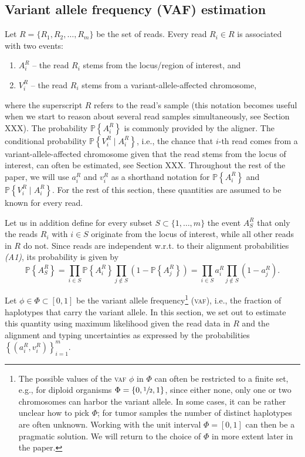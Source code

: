 \documentclass[a4paper,12pt]{article}
\newcommand{\p}[1]{\mathds{P}\left\{#1 \right\}}
\begin{document}
\subsection{Variant allele frequency (\textsc{VAF}) estimation}
Let $R = \{R_1, R_2, \dots, R_m \}$ be the set of reads. Every read $R_i \in R$ is associated with two events:
\begin{enumerate}
 \item $A_i^R$ -- the read $R_i$ stems from the locus/region of interest, and 
 \item $V_i^R$ -- the read $R_i$ stems from a variant-allele-affected chromosome, 
\end{enumerate}
where the superscript $R$ refers to the read's sample (this notation becomes useful when we start to reason about several read samples simultaneously, see Section XXX).  
The probability $\p{A_i^R}$ is commonly provided by the aligner. The conditional probability $\p{V_i^R \mid A_i^R}$, i.e., the chance that $i$-th read comes from a variant-allele-affected chromosome given that the read stems from the locus of interest, can often be estimated, see Section XXX. Throughout the rest of the paper, we will use $a_i^R$ and $v_i^R$ as a shorthand notation for $\p{A_i^R}$ and $\p{V_i^R \mid A_i^R}$. For the rest of this section, these quantities are assumed to be known for every read.   

Let us in addition define for every subset $S \subset \{1,\dots,m\}$ the event $A_S^R$ that only the reads $R_i$ with $i \in S$ originate from the locus of interest, while all other reads in $R$ do not. Since reads are independent w.r.t. to their alignment probabilities \textit{(A1)}, its probability is given by
\begin{equation}
 \p{A_S^R} =  \prod_{i \in S} \p{A_i^R} \prod_{j \not \in S} \left(1 - \p{A_j^R} \right) = \prod_{i \in S} a_i^R \prod_{j \not \in S} \left(1 - a_j^R \right). 
 \label{eq:subset}
\end{equation}

Let $\phi \in \Phi \subset [0,1]$ be the variant allele frequency\footnote{The possible values of the \textsc{vaf} $\phi$ in $\Phi$ can often be restricted to a finite set, e.g., for diploid organisms $\Phi = \{0, \sfrac{1}{2}, 1\}$, since either none, only one or two chromosomes can harbor the variant allele. In some cases, it can be rather unclear how to pick $\Phi$; for tumor samples the number of distinct haplotypes are often unknown. Working with the unit interval $\Phi = [0,1]$ can then be a pragmatic solution. We will return to the choice of $\Phi$ in more extent later in the paper.} (\textsc{vaf}), i.e., the fraction of haplotypes that carry the variant allele. In this section, we set out to estimate this quantity using maximum likelihood given the read data in $R$ and the alignment and typing uncertainties as expressed by the probabilities $\left\{(a_i^R, v_i^R)\right\}_{i=1}^m$. 
\end{document}
